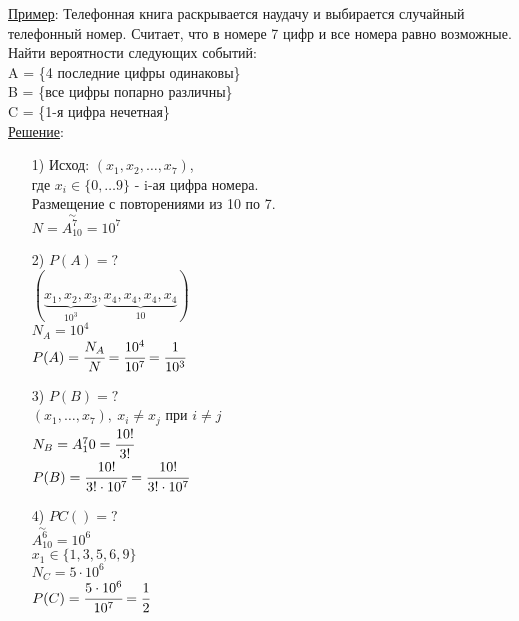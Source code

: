\underline{Пример}: Телефонная книга раскрывается наудачу и выбирается случайный телефонный номер. Считает, что в номере 7 цифр и все номера равно возможные. Найти вероятности следующих событий: \\
A = \{4 последние цифры одинаковы\} \\
B = \{все цифры попарно различны\} \\
C = \{1-я цифра нечетная\} \\
\underline{Решение}: 
\begin{enumerate}
\item[1)] Исход: $(x_1, x_2, \ldots, x_7)$, \\
где $x_i \in \{0, \ldots 9\}$ - i-ая цифра номера. \\
Размещение с повторениями из 10 по 7. \\
$N = \stackrel{\sim}{A^7_10} = 10^7$ \\

\item[2)] $P(A) = ?$ \\
$( \underbrace{x_1, x_2, x_3}_{10^3}, \underbrace{x_4, x_4, x_4, x_4}_{10} )$ \\
$N_A = 10^4$ \\
$P(A) = \cfrac{N_A}{N} = \cfrac{10^4}{10^7} = \cfrac{1}{10^3}$ \\

\item[3)] $P(B) = ?$ \\
$(x_1, \ldots, x_7), \ x_i \neq x_j$ при $i \neq j$ \\
$N_B = A^7_10 = \cfrac{10!}{3!}$ \\
$P(B) = \cfrac{10!}{3! \cdot 10^7} = \cfrac{10!}{3! \cdot 10^7}$ \\

\item[4)] $PC() = ?$ \\
$\stackrel{\sim}{A^6_10} = 10^6$ \\
$x_1 \in \{ 1,3,5,6,9\}$ \\
$N_C = 5 \cdot 10^6$ \\
$P(C) = \cfrac{5 \cdot 10^6}{10^7} = \cfrac{1}{2}$ \\ 
\end{enumerate}


